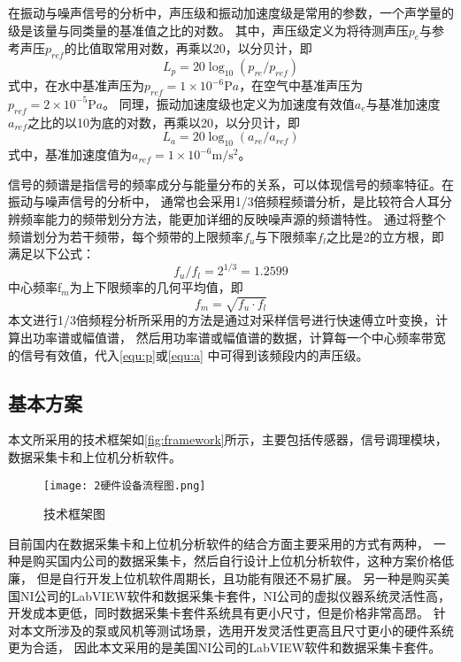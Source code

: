 在振动与噪声信号的分析中，声压级和振动加速度级是常用的参数，一个声学量的级是该量与同类量的基准值之比的对数。
其中，声压级定义为将待测声压$p_e$与参考声压$p_{ref}$的比值取常用对数，再乘以20，以分贝计，即
\begin{equation}
    \label{equ:p}
    L_{p} = 20\log_{10}{\left(p_{re}/p_{ref}\right )}
\end{equation}
式中，在水中基准声压为$p_{ref}= 1\times 10^{-6} \mathrm{P} a$，在空气中基准声压为$p_{ref}= 2\times 10^{-5} \mathrm{P} a$。
同理，振动加速度级也定义为加速度有效值$a_e$与基准加速度$a_{ref}$之比的以10为底的对数，再乘以20，以分贝计，即
\begin{equation}
    \label{equ:a}
    L_{a} = 20\log_{10}{\left(a_{re}/a_{ref}\right )}
\end{equation}
式中，基准加速度值为$a_{ref}= 1\times 10^{-6} \mathrm{m/s^2} $。

信号的频谱是指信号的频率成分与能量分布的关系，可以体现信号的频率特征。在振动与噪声信号的分析中，
通常也会采用1/3倍频程频谱分析，是比较符合人耳分辨频率能力的频带划分方法，能更加详细的反映噪声源的频谱特性。
通过将整个频谱划分为若干频带，每个频带的上限频率$f_u$与下限频率$f_l$之比是2的立方根，即满足以下公式：
\begin{equation}
    \label{equ:fu}
    f_{u}/f_{l}=2^{1/3}=1.2599
\end{equation}
中心频率f$_{m}$为上下限频率的几何平均值，即
\begin{equation}
    \label{equ:fm}
    f_{m}=\sqrt{f_{u}\cdot f_{l} } 
\end{equation}
本文进行1/3倍频程分析所采用的方法是通过对采样信号进行快速傅立叶变换，计算出功率谱或幅值谱，
然后用功率谱或幅值谱的数据，计算每一个中心频率带宽的信号有效值，代入\autoref{equ:p}或\autoref{equ:a}
中可得到该频段内的声压级。
\subsection{基本方案}
本文所采用的技术框架如\autoref{fig:framework}所示，主要包括传感器，信号调理模块，数据采集卡和上位机分析软件。
\begin{figure}[htbp]
    \centering
    \texttt{[image: 2硬件设备流程图.png]}
    \caption{\label{fig:framework}技术框架图}
\end{figure}

目前国内在数据采集卡和上位机分析软件的结合方面主要采用的方式有两种，
一种是购买国内公司的数据采集卡，然后自行设计上位机分析软件，这种方案价格低廉，
但是自行开发上位机软件周期长，且功能有限还不易扩展。
另一种是购买美国NI公司的LabVIEW软件和数据采集卡套件，NI公司的虚拟仪器系统灵活性高，
开发成本更低，同时数据采集卡套件系统具有更小尺寸，但是价格非常高昂。
针对本文所涉及的泵或风机等测试场景，选用开发灵活性更高且尺寸更小的硬件系统更为合适，
因此本文采用的是美国NI公司的LabVIEW软件和数据采集卡套件。

